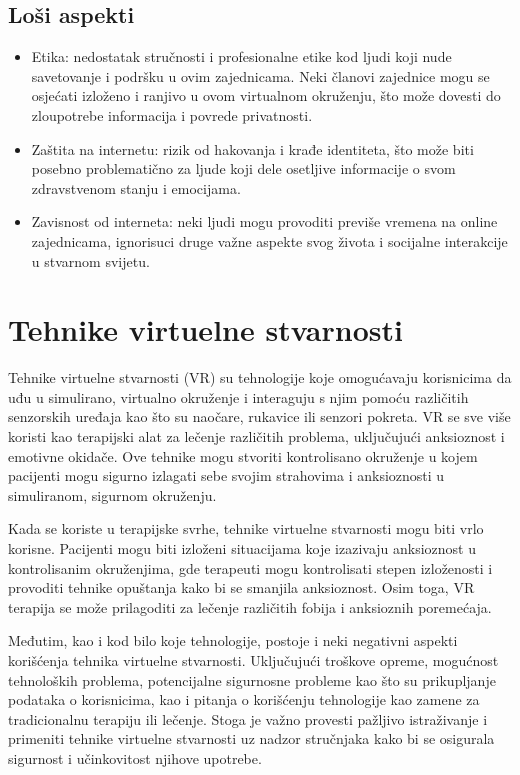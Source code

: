 \documentclass[a4paper]{article}
\begin{document}
\subsection{Loši aspekti}
\begin{itemize}
\item Etika: nedostatak stručnosti i profesionalne etike kod ljudi koji nude savetovanje i podršku u ovim zajednicama. Neki članovi zajednice mogu se osjećati izloženo i ranjivo u ovom virtualnom okruženju, što može dovesti do zloupotrebe informacija i povrede privatnosti.

\item Zaštita na internetu: rizik od hakovanja i krađe identiteta, što može biti posebno problematično za ljude koji dele osetljive informacije o svom zdravstvenom stanju i emocijama.

\item Zavisnost od interneta: neki ljudi mogu provoditi previše vremena na online zajednicama, ignorisuci druge važne aspekte svog života i socijalne interakcije u stvarnom svijetu.
\end{itemize}
\section{Tehnike virtuelne stvarnosti}
\label{sec:tehnikeVS}
Tehnike virtuelne stvarnosti (VR) su tehnologije koje omogućavaju korisnicima da uđu u simulirano, virtualno okruženje i interaguju s njim pomoću različitih senzorskih uređaja kao što su naočare, rukavice ili senzori pokreta. VR se sve više koristi kao terapijski alat za lečenje različitih problema, uključujući anksioznost i emotivne okidače. Ove tehnike mogu stvoriti kontrolisano okruženje u kojem pacijenti mogu sigurno izlagati sebe svojim strahovima i anksioznosti u simuliranom, sigurnom okruženju.

Kada se koriste u terapijske svrhe, tehnike virtuelne stvarnosti mogu biti vrlo korisne. Pacijenti mogu biti izloženi situacijama koje izazivaju anksioznost u kontrolisanim okruženjima, gde terapeuti mogu kontrolisati stepen izloženosti i provoditi tehnike opuštanja kako bi se smanjila anksioznost. Osim toga, VR terapija se može prilagoditi za lečenje različitih fobija i anksioznih poremećaja.

Međutim, kao i kod bilo koje tehnologije, postoje i neki negativni aspekti korišćenja tehnika virtuelne stvarnosti. Uključujući troškove opreme, mogućnost tehnoloških problema, potencijalne sigurnosne probleme kao što su prikupljanje podataka o korisnicima, kao i pitanja o korišćenju tehnologije kao zamene za tradicionalnu terapiju ili lečenje. Stoga je važno provesti pažljivo istraživanje i primeniti tehnike virtuelne stvarnosti uz nadzor stručnjaka kako bi se osigurala sigurnost i učinkovitost njihove upotrebe.
\end{document}
